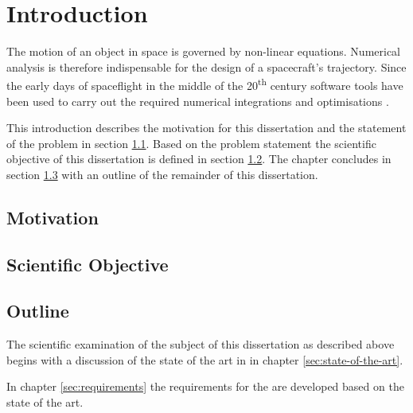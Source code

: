 \chapter{Introduction}
\label{sec:introduction}
The motion of an object in space is governed by non-linear equations.
Numerical analysis is therefore indispensable for the design of a spacecraft's trajectory.
Since the early days of spaceflight in the middle of the 20\textsuperscript{th} century software tools have been used to carry out the required numerical integrations and optimisations .



This introduction describes the motivation for this dissertation and the statement of the problem in section \ref{sec:motivation}.
Based on the problem statement the scientific objective of this dissertation is defined in section \ref{sec:scientific-objective}.
The chapter concludes in section \ref{sec:outline} with an outline of the remainder of this dissertation.

\section{Motivation}
\label{sec:motivation}

\section{Scientific Objective}
\label{sec:scientific-objective}

\section{Outline}
\label{sec:outline}
The scientific examination of the subject of this dissertation as described above begins with a discussion of the state of the art in  in chapter \ref{sec:state-of-the-art}.

In chapter \ref{sec:requirements} the requirements for the \topic are developed based on the state of the art.



